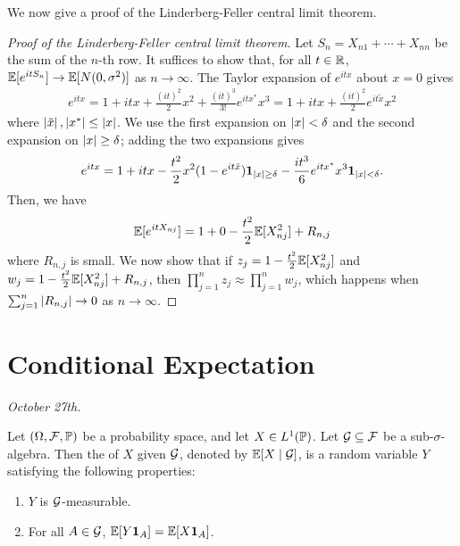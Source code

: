 We now give a proof of the Linderberg-Feller central limit theorem.

\begin{proof}[Proof of the Linderberg-Feller central limit theorem]
    Let $S_{n} = X_{n1}+\cdots+X_{nn}$ be the sum of the $n$-th row. It suffices to show that, for all $t \in \mathbb{R}$, $\mathbb{E}[e^{it S_{n}}] \to \mathbb{E}[N(0,\sigma^{2})]$ as $n \to \infty$. The Taylor expansion of $e^{itx}$ about $x=0$ gives
    \begin{align}
        e^{itx} = 1+itx + \frac{(it)^{2}}{2}x^{2} + \frac{(it)^{3}}{3!}e^{itx^{\ast}}x^{3} = 1 + itx + \frac{(it)^{2}}{2} e^{it \tilde{x}}x^{2}
    \end{align}
    where $\left| \tilde{x} \right|,\left| x^{\ast} \right| \leq \left| x \right|$. We use the first expansion on $\left| x \right| < \delta$ and the second expansion on $\left| x \right| \geq \delta$; adding the two expansions gives
    \begin{align}
        e^{itx} = 1 + itx - \frac{t^{2}}{2}x^{2}(1-e^{it\tilde{x}}) \textbf{1}_{\left| x \right| \geq \delta} - \frac{it^{3}}{6}e^{itx^{\ast}}x^{3} \textbf{1}_{\left| x \right| < \delta}.
    \end{align}
    Then, we have
    \begin{align}
        \mathbb{E}[e^{it X_{nj}}] = 1 + 0 - \frac{t^{2}}{2} \mathbb{E}[X_{nj}^{2}] + R_{n,j}
    \end{align}
    where $R_{n,j}$ is small. We now show that if $z_{j} = 1-\frac{t^{2}}{2}\mathbb{E}[X_{nj}^{2}]$ and $w_{j} = 1-\frac{t^{2}}{2}\mathbb{E}[X_{nj}^{2}] + R_{n,j}$, then $\prod_{j=1}^{n} z_{j} \approx \prod_{j=1}^{n} w_{j}$, which happens when $\sum_{j=1}^{n} \left| R_{n,j} \right| \to 0$ as $n \to \infty$. 
\end{proof}

\section{Conditional Expectation}
\textit{October 27th.}

\begin{definition}
    Let $(\Omega,\mathcal{F},\mathbb{P})$ be a probability space, and let $X \in L^{1}(\mathbb{P})$. Let $\mathcal{G} \subseteq \mathcal{F}$ be a sub-$\sigma$-algebra. Then the  of $X$ given $\mathcal{G}$, denoted by $\mathbb{E}[X \mid \mathcal{G}]$, is a random variable $Y$ satisfying the following properties:
    \begin{enumerate}
        \item $Y$ is $\mathcal{G}$-measurable.
        \item For all $A \in \mathcal{G}$, $\mathbb{E}[Y\textbf{1}_{A}] = \mathbb{E}[X\textbf{1}_{A}]$.
    \end{enumerate}
\end{definition}

